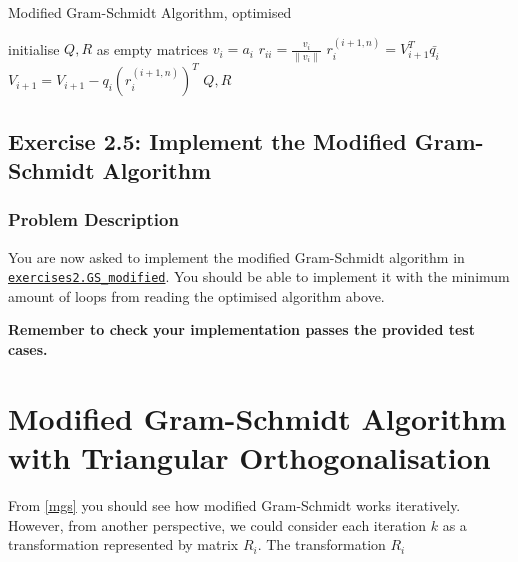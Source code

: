 \begin{algorithm}
  \caption{Modified Gram-Schmidt Algorithm, optimised}
  \label{mgs-algorithm-optimised}
  \begin{algorithmic}[1]
    \State initialise \(Q, R\)  as empty matrices
      \State \(v_i = a_i\)
      \State \(r_{ii} = \frac{v_i}{\|v_i\|}\)
      \State \(r_i^{(i + 1, n)} = V_{i + 1}^{T}\bar{q_i}\)
      \State \(V_{i + 1} = V_{i + 1} - q_i (r_i^{(i + 1, n)})^{T}\)    
    \EndFor
    \State \Return \(Q, R\)
  \EndProcedure
  \end{algorithmic}
  \end{algorithm}

\subsection*{Exercise 2.5: Implement the Modified Gram-Schmidt Algorithm}
\subsubsection*{Problem Description}%
You are now asked to implement the modified Gram-Schmidt algorithm in \href{https://comp-lin-alg.github.io/cla_utils.html#cla_utils.exercises2.GS_modified}{\texttt{exercises2.GS\_modified}}. You should be able to implement it with the minimum amount of loops from reading the optimised algorithm above. \medskip

\noindent \textbf{Remember to check your implementation passes the provided test cases.}

\section{Modified Gram-Schmidt Algorithm with Triangular Orthogonalisation}
From \autoref{mgs} you should see how modified Gram-Schmidt works iteratively. However, from another perspective, we could consider each iteration \(k\) as a transformation represented by matrix \(R_i\). The transformation \(R_i\)  



